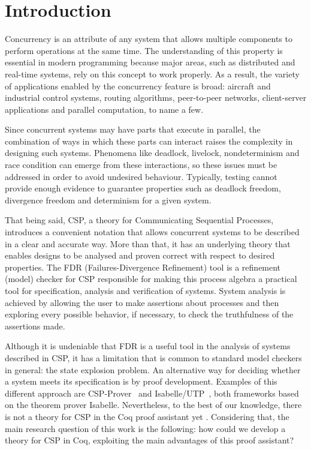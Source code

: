 \chapter{Introduction}
\label{chapter:introduction}

Concurrency is an attribute of any system that allows multiple components to perform operations at the same time. The understanding of this property is essential in modern programming because major areas, such as distributed and real-time systems, rely on this concept to work properly. As a result, the variety of applications enabled by the concurrency feature is broad: aircraft and industrial control systems, routing algorithms, peer-to-peer networks, client-server applications and parallel computation, to name a few.

Since concurrent systems may have parts that execute in parallel, the combination of ways in which these parts can interact raises the complexity in designing such systems. Phenomena like deadlock, livelock, nondeterminism and race condition can emerge from these interactions, so these issues must be addressed in order to avoid undesired behaviour. Typically, testing cannot provide enough evidence to guarantee properties such as deadlock freedom, divergence freedom and determinism for a given system.

That being said, CSP, a theory for Communicating Sequential Processes, introduces a convenient notation that allows concurrent systems to be described in a clear and accurate way. More than that, it has an underlying theory that enables designs to be analysed and proven correct with respect to desired properties. The FDR (Failures-Divergence Refinement) tool is a refinement (model) checker for CSP responsible for making this process algebra a practical tool for specification, analysis and verification of systems. System analysis is achieved by allowing the user to make assertions about processes and then exploring every possible behavior, if necessary, to check the truthfulness of the assertions made.

Although it is undeniable that FDR is a useful tool in the analysis of systems described in CSP, it has a limitation that is common to standard model checkers in general: the state explosion problem. An alternative way for deciding whether a system meets its specification is by proof development. Examples of this different approach are CSP-Prover~\cite{Roggenbach:CSP-Prover} and Isabelle/UTP~\cite{Woodcock:Isabelle/UTP}, both frameworks based on the theorem prover Isabelle. Nevertheless, to the best of our knowledge, there is not a theory for CSP in the Coq proof assistant yet \cite{bertot:coq}. Considering that, the main research question of this work is the following: how could we develop a theory for CSP in Coq, exploiting the main advantages of this proof assistant?

